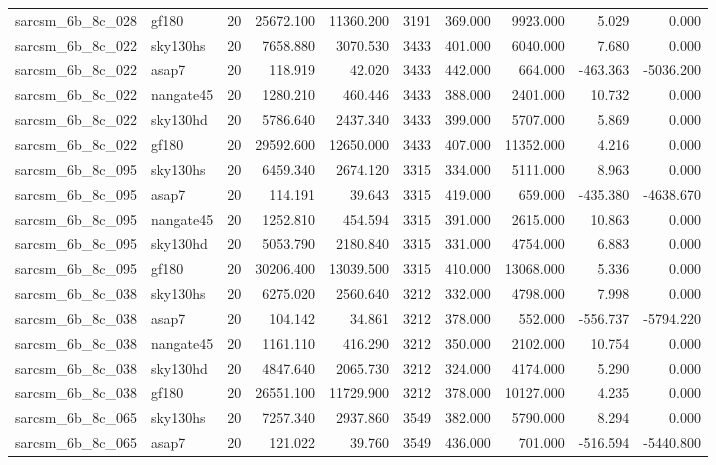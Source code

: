 \begin{tabular}{llrrrrrrrr}
sarcsm\_6b\_8c\_028 & gf180 & 20 & 25672.100 & 11360.200 & 3191 & 369.000 & 9923.000 & 5.029 & 0.000 \\
sarcsm\_6b\_8c\_022 & sky130hs & 20 & 7658.880 & 3070.530 & 3433 & 401.000 & 6040.000 & 7.680 & 0.000 \\
sarcsm\_6b\_8c\_022 & asap7 & 20 & 118.919 & 42.020 & 3433 & 442.000 & 664.000 & -463.363 & -5036.200 \\
sarcsm\_6b\_8c\_022 & nangate45 & 20 & 1280.210 & 460.446 & 3433 & 388.000 & 2401.000 & 10.732 & 0.000 \\
sarcsm\_6b\_8c\_022 & sky130hd & 20 & 5786.640 & 2437.340 & 3433 & 399.000 & 5707.000 & 5.869 & 0.000 \\
sarcsm\_6b\_8c\_022 & gf180 & 20 & 29592.600 & 12650.000 & 3433 & 407.000 & 11352.000 & 4.216 & 0.000 \\
sarcsm\_6b\_8c\_095 & sky130hs & 20 & 6459.340 & 2674.120 & 3315 & 334.000 & 5111.000 & 8.963 & 0.000 \\
sarcsm\_6b\_8c\_095 & asap7 & 20 & 114.191 & 39.643 & 3315 & 419.000 & 659.000 & -435.380 & -4638.670 \\
sarcsm\_6b\_8c\_095 & nangate45 & 20 & 1252.810 & 454.594 & 3315 & 391.000 & 2615.000 & 10.863 & 0.000 \\
sarcsm\_6b\_8c\_095 & sky130hd & 20 & 5053.790 & 2180.840 & 3315 & 331.000 & 4754.000 & 6.883 & 0.000 \\
sarcsm\_6b\_8c\_095 & gf180 & 20 & 30206.400 & 13039.500 & 3315 & 410.000 & 13068.000 & 5.336 & 0.000 \\
sarcsm\_6b\_8c\_038 & sky130hs & 20 & 6275.020 & 2560.640 & 3212 & 332.000 & 4798.000 & 7.998 & 0.000 \\
sarcsm\_6b\_8c\_038 & asap7 & 20 & 104.142 & 34.861 & 3212 & 378.000 & 552.000 & -556.737 & -5794.220 \\
sarcsm\_6b\_8c\_038 & nangate45 & 20 & 1161.110 & 416.290 & 3212 & 350.000 & 2102.000 & 10.754 & 0.000 \\
sarcsm\_6b\_8c\_038 & sky130hd & 20 & 4847.640 & 2065.730 & 3212 & 324.000 & 4174.000 & 5.290 & 0.000 \\
sarcsm\_6b\_8c\_038 & gf180 & 20 & 26551.100 & 11729.900 & 3212 & 378.000 & 10127.000 & 4.235 & 0.000 \\
sarcsm\_6b\_8c\_065 & sky130hs & 20 & 7257.340 & 2937.860 & 3549 & 382.000 & 5790.000 & 8.294 & 0.000 \\
sarcsm\_6b\_8c\_065 & asap7 & 20 & 121.022 & 39.760 & 3549 & 436.000 & 701.000 & -516.594 & -5440.800 \\

\end{tabular}
